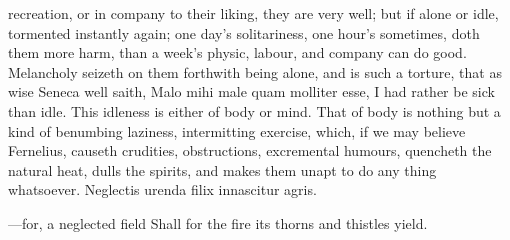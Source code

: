 {{recreation, or in company to their liking, they are very well; but if
alone or idle, tormented instantly again; one day's solitariness, one
hour's sometimes, doth them more harm, than a week's physic, labour,
and company can do good. Melancholy seizeth on them forthwith being
alone, and is such a torture, that as wise Seneca well saith, Malo mihi
male quam molliter esse, I had rather be sick than idle. This idleness
is either of body or mind. That of body is nothing but a kind of
benumbing laziness, intermitting exercise, which, if we may believe
Fernelius, causeth crudities, obstructions, excremental humours,
quencheth the natural heat, dulls the spirits, and makes them unapt to
do any thing whatsoever.
Neglectis urenda filix innascitur agris.

---for, a neglected field
Shall for the fire its thorns and thistles yield.

}}
